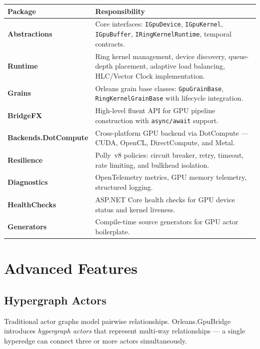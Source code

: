 \documentclass[11pt,a4paper]{article}
\begin{document}
\vspace{0.5em}
\noindent
\renewcommand{\arraystretch}{1.2}
\begin{tabularx}{\textwidth}{>{\bfseries\color{brand}}l X}
\toprule
\textbf{Package} & \textbf{Responsibility} \\
\midrule
Abstractions &
  Core interfaces: \texttt{IGpuDevice}, \texttt{IGpuKernel},
  \texttt{IGpuBuffer}, \texttt{IRingKernelRuntime}, temporal contracts. \\
Runtime &
  Ring kernel management, device discovery, queue-depth placement,
  adaptive load balancing, HLC/Vector Clock implementation. \\
Grains &
  Orleans grain base classes: \texttt{GpuGrainBase},
  \texttt{RingKernelGrainBase} with lifecycle integration. \\
BridgeFX &
  High-level fluent API for GPU pipeline construction with
  \texttt{async/await} support. \\
Backends.DotCompute &
  Cross-platform GPU backend via DotCompute --- CUDA, OpenCL,
  DirectCompute, and Metal. \\
Resilience &
  Polly~v8 policies: circuit breaker, retry, timeout, rate limiting,
  and bulkhead isolation. \\
Diagnostics &
  OpenTelemetry metrics, GPU memory telemetry, structured logging. \\
HealthChecks &
  ASP.NET Core health checks for GPU device status and kernel liveness. \\
Generators &
  Compile-time source generators for GPU actor boilerplate. \\
\bottomrule
\end{tabularx}
\vspace{0.5em}

\newpage
\section{Advanced Features}

\subsection{Hypergraph Actors}

Traditional actor graphs model pairwise relationships. Orleans.GpuBridge
introduces \emph{hypergraph actors} that represent multi-way relationships
--- a single hyperedge can connect three or more actors simultaneously.
\end{document}
